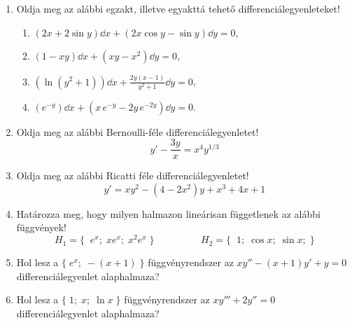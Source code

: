 \documentclass{szb-practice}
\begin{document}
\begin{enumerate}
  \item Oldja meg az alábbi egzakt, illetve egyakttá tehető
        differenciálegyenleteket!
        \begin{enumerate}
          \item $\displaystyle
                  (2x + 2 \sin y) \dd x
                  + (2x \cos y - \sin y) \dd y
                  = 0
                $,
                \vspace{2mm}

          \item $\displaystyle
                  (1 - xy) \dd x
                  + (xy - x^2) \dd y
                  = 0
                $,

          \item $\displaystyle
                  \left( \ln (y^2 + 1) \right) \dd x
                  + \frac{2y(x - 1)}{y^2 + 1} \dd y
                  = 0
                $,

          \item $\displaystyle
                  \left( e^{-y} \right) \dd x
                  + \left( x \, e^{-y} - 2y \, e^{-2y} \right) \dd y
                  = 0
                $.
        \end{enumerate}

  \item Oldja meg az alábbi Bernoulli-féle differenciálegyenletet!
        $$
          y' - \frac{3y}{x} = x^4 y^{1/3}
        $$

  \item Oldja meg az alábbi Ricatti féle differenciálegyenletet!
        $$
          y' = xy^2 - (4 - 2x^2)y + x^3 + 4x + 1
        $$

  \item Határozza meg, hogy milyen halmazon lineárisan függetlenek az alábbi
        függvények!
        $$
          H_1 = \Big\{\;
          \;e^x;
          \;xe^x;
          \;x^2e^x
          \;\Big\}
          \hspace{2cm}
          H_2 = \Big\{\;
          \;1;
          \;\cos x;
          \;\sin x;
          \;\Big\}
        $$

  \item Hol lesz a $\{ \; e^x; \; -(x + 1) \; \}$ függvényrendszer az
        $xy'' - (x + 1)y' + y = 0$ differenciálegyenlet alaphalmaza?

  \item Hol lesz a $\{ \; 1; \; x; \; \ln x \; \}$ függvényrendszer az
        $xy''' + 2y'' = 0$ differenciálegyenlet alaphalmaza?


\end{enumerate}
\end{document}
